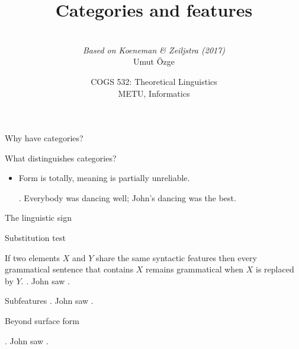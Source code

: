 \documentclass[ignorenonframetext,10pt,aspectratio=169]{beamer}
\title{Categories and features}
\author{\  \\  {\it Based on Koeneman \& Zeiljstra (2017)} \\ \vspace{20pt} Umut \"Ozge\\  }
\date{COGS 532: Theoretical Linguistics\\ METU, Informatics}
\begin{document}
\begin{frame}\frametitle{}
\thispagestyle{empty}
\maketitle
\end{frame}

\begin{frame}[t,plain]{Why have categories?}

\end{frame}

\begin{frame}[t,plain]{What distinguishes categories?}
\pause

\begin{itemize}
\item Form is totally, meaning is partially unreliable.

\ex. Everybody was \alert{dancing} well; John's \alert{dancing} was the best.

\end{itemize}
\end{frame}

\begin{frame}[t,plain]{The linguistic sign}

\end{frame}

\begin{frame}[t,plain]{Substitution test}

If two elements $X$ and $Y$ share the same syntactic features then every grammatical sentence that contains $X$ remains grammatical when $X$ is replaced by $Y$.
\pause
\ex. John saw . 

\end{frame}


\begin{frame}[t,plain]{Subfeatures}
\ex. John saw .

\end{frame}

\begin{frame}[t,plain]{Beyond surface form}

\ex. John saw .

\end{frame}
\end{document}
